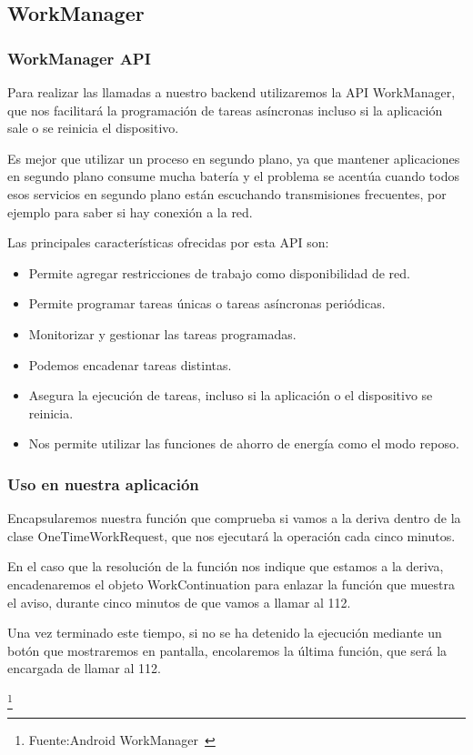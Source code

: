 \label{jobscheduler}

\subsection{WorkManager}
\subsubsection{WorkManager API}
Para realizar las llamadas a nuestro backend utilizaremos la 
API WorkManager, que nos facilitará la programación de tareas
 asíncronas incluso si la aplicación sale o se reinicia el dispositivo.

Es mejor que utilizar un proceso en segundo plano, ya que
 mantener aplicaciones en segundo plano consume mucha batería
 y el problema se acentúa cuando todos esos servicios en segundo
 plano están escuchando transmisiones frecuentes, por ejemplo
 para saber si hay conexión a la red.

Las principales características ofrecidas por esta API son:

\begin{itemize}
\item Permite agregar restricciones de trabajo como disponibilidad de red.
\item Permite programar tareas únicas o tareas asíncronas periódicas.
\item Monitorizar y gestionar las tareas programadas.
\item Podemos encadenar tareas distintas.
\item Asegura la ejecución de tareas, incluso si la aplicación o 
el dispositivo se reinicia.
\item Nos permite utilizar las funciones de ahorro de energía
 como el modo reposo.
\end{itemize}

\subsubsection{Uso en nuestra aplicación}

Encapsularemos nuestra función que comprueba si vamos a la deriva
 dentro de la clase OneTimeWorkRequest, que nos ejecutará la 
operación cada cinco minutos.

En el caso que la resolución de la función nos indique que estamos
 a la deriva, encadenaremos el objeto WorkContinuation para enlazar
 la función que muestra el aviso, durante cinco minutos de que vamos a llamar al 112.

Una vez terminado este tiempo, si no se ha detenido la ejecución mediante un botón que mostraremos en pantalla, encolaremos la última función, que será la encargada de llamar al 112.


\footnote{Fuente:Android WorkManager~\cite{ANDROIDWORKMANAGER}}